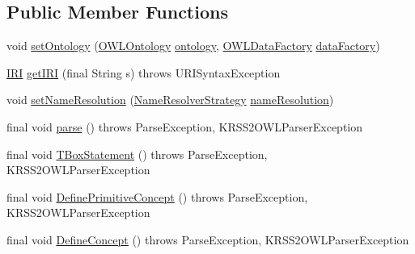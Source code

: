 \subsection*{Public Member Functions}
\begin{DoxyCompactItemize}
\item 
void \hyperlink{classde_1_1uulm_1_1ecs_1_1ai_1_1owlapi_1_1krssparser_1_1_k_r_s_s2_parser_af50b46527609c1c8442d785b59a9d4b5}{set\-Ontology} (\hyperlink{interfaceorg_1_1semanticweb_1_1owlapi_1_1model_1_1_o_w_l_ontology}{O\-W\-L\-Ontology} \hyperlink{classde_1_1uulm_1_1ecs_1_1ai_1_1owlapi_1_1krssparser_1_1_k_r_s_s2_parser_a149352290fdd2971006dbd7e5476d1d7}{ontology}, \hyperlink{interfaceorg_1_1semanticweb_1_1owlapi_1_1model_1_1_o_w_l_data_factory}{O\-W\-L\-Data\-Factory} \hyperlink{classde_1_1uulm_1_1ecs_1_1ai_1_1owlapi_1_1krssparser_1_1_k_r_s_s2_parser_a16728a1ef697d80719f5a25aa5c43638}{data\-Factory})
\item 
\hyperlink{classorg_1_1semanticweb_1_1owlapi_1_1model_1_1_i_r_i}{I\-R\-I} \hyperlink{classde_1_1uulm_1_1ecs_1_1ai_1_1owlapi_1_1krssparser_1_1_k_r_s_s2_parser_a45f06b7d4a66c925476ff98113eff461}{get\-I\-R\-I} (final String s)  throws U\-R\-I\-Syntax\-Exception 
\item 
void \hyperlink{classde_1_1uulm_1_1ecs_1_1ai_1_1owlapi_1_1krssparser_1_1_k_r_s_s2_parser_ae6d5d4e9b6a05a801a33694b97b987bc}{set\-Name\-Resolution} (\hyperlink{enumorg_1_1coode_1_1owl_1_1krssparser_1_1_name_resolver_strategy}{Name\-Resolver\-Strategy} \hyperlink{classde_1_1uulm_1_1ecs_1_1ai_1_1owlapi_1_1krssparser_1_1_k_r_s_s2_parser_a86a1d3c988af87daa0eea4c5b2d17c97}{name\-Resolution})
\item 
final void \hyperlink{classde_1_1uulm_1_1ecs_1_1ai_1_1owlapi_1_1krssparser_1_1_k_r_s_s2_parser_a697b8a65dda7b08acf1277abbc6de48c}{parse} ()  throws Parse\-Exception, K\-R\-S\-S2\-O\-W\-L\-Parser\-Exception 
\item 
final void \hyperlink{classde_1_1uulm_1_1ecs_1_1ai_1_1owlapi_1_1krssparser_1_1_k_r_s_s2_parser_a1c3ac67fbc95405a482935b0c03a74f2}{T\-Box\-Statement} ()  throws Parse\-Exception, K\-R\-S\-S2\-O\-W\-L\-Parser\-Exception 
\item 
final void \hyperlink{classde_1_1uulm_1_1ecs_1_1ai_1_1owlapi_1_1krssparser_1_1_k_r_s_s2_parser_a094934dc899490ce188ef891179dfa08}{Define\-Primitive\-Concept} ()  throws Parse\-Exception,     K\-R\-S\-S2\-O\-W\-L\-Parser\-Exception 
\item 
final void \hyperlink{classde_1_1uulm_1_1ecs_1_1ai_1_1owlapi_1_1krssparser_1_1_k_r_s_s2_parser_ad30f77eec9a1459bc7ac169672f7df52}{Define\-Concept} ()  throws Parse\-Exception, K\-R\-S\-S2\-O\-W\-L\-Parser\-Exception 

\end{DoxyCompactItemize}
